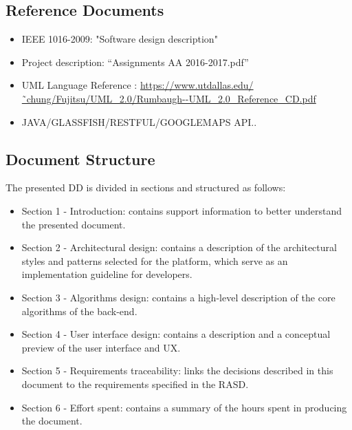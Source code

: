 \subsection{Reference Documents}
\begin{itemize}
		\item IEEE 1016-2009: "Software design description"
		\item Project description: “Assignments AA 2016-2017.pdf”
	
	 	\item UML Language Reference : \url{https://www.utdallas.edu/˜chung/Fujitsu/UML_2.0/Rumbaugh--UML_2.0_Reference_CD.pdf}
	 	\item JAVA/GLASSFISH/RESTFUL/GOOGLEMAPS API..
	\end{itemize}
	

\subsection{Document Structure}
The presented DD is divided in sections and structured as follows:
\begin{itemize}
\item Section 1 - Introduction: contains support information to better understand
the presented document.
\item Section 2 - Architectural design: contains a description of the architectural
styles and patterns selected for the platform, which serve as an
implementation guideline for developers.
\item Section 3 - Algorithms design: contains a high-level description of the
core algorithms of the back-end.
\item Section 4 - User interface design: contains a description and a conceptual
preview of the user interface and UX.
\item Section 5 - Requirements traceability: links the decisions described in
this document to the requirements specified in the RASD.
\item Section 6 - Effort spent: contains a summary of the hours spent
in producing the document.
\end{itemize}